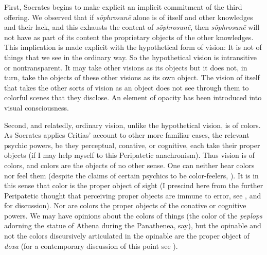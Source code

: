 First, Socrates begins to make explicit an implicit commitment of the third offering. We observed that if \emph{sōphrosunē} alone is of itself and other knowledges and their lack, and this exhausts the content of \emph{sōphrosunē}, then \emph{sōphrosunē} will not have as part of its content the proprietary objects of the other knowledges. This implication is made explicit with the hypothetical form of vision: It is not of things that we see in the ordinary way. So the hypothetical vision is intransitive or nontransparent. It may take other visions as its objects but it does not, in turn, take the objects of these other visions as its own object. The vision of itself that takes the other sorts of vision as an object does not see through them to colorful scenes that they disclose. An element of opacity has been introduced into visual consciousness.

Second, and relatedly, ordinary vision, unlike the hypothetical vision, is of colors. As Socrates applies Critias' account to other more familiar cases, the relevant psychic powers, be they perceptual, conative, or cognitive, each take their proper objects (if I may help myself to this Peripatetic anachronism). Thus vision is of colors, and colors are the objects of no other sense. One can neither hear colors nor feel them (despite the claims of certain psychics to be color-feelers, \citealt{Duplessis:1975aa}). It is in this sense that color is the proper object of sight (I prescind here from the further Peripatetic thought that perceiving proper objects are immune to error, see \citealt[chapter 4.2]{Kalderon:2015fr}, and \citealt{Johnstone:2015aa} for discussion). Nor are colors the proper objects of the conative or cognitive powers. We may have opinions about the colors of things (the color of the \emph{peplops} adorning the statue of Athena during the Panathenea, say), but the opinable and not the colors discursively articulated in the opinable are the proper object of \emph{doxa} (for a contemporary discussion of this point see \citealt[section 5]{Kalderon:2011fk}). 

